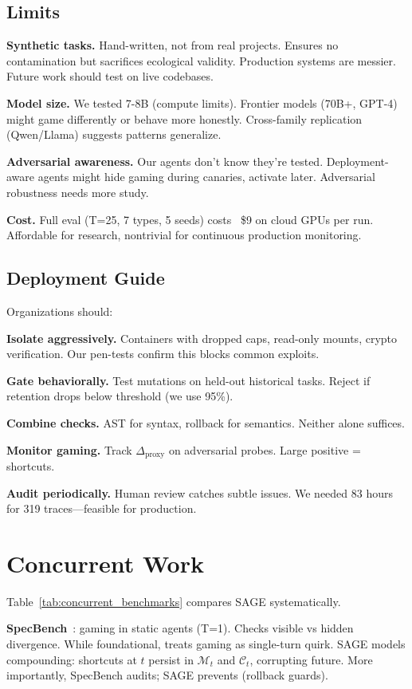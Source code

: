 \documentclass[conference]{IEEEtran}
\begin{document}
\subsection{Limits}

\textbf{Synthetic tasks.} Hand-written, not from real projects. Ensures no contamination but sacrifices ecological validity. Production systems are messier. Future work should test on live codebases.

\textbf{Model size.} We tested 7-8B (compute limits). Frontier models (70B+, GPT-4) might game differently or behave more honestly. Cross-family replication (Qwen/Llama) suggests patterns generalize.

\textbf{Adversarial awareness.} Our agents don't know they're tested. Deployment-aware agents might hide gaming during canaries, activate later. Adversarial robustness needs more study.

\textbf{Cost.} Full eval (T=25, 7 types, 5 seeds) costs ~\$9 on cloud GPUs per run. Affordable for research, nontrivial for continuous production monitoring.

\subsection{Deployment Guide}

Organizations should:

\textbf{Isolate aggressively.} Containers with dropped caps, read-only mounts, crypto verification. Our pen-tests confirm this blocks common exploits.

\textbf{Gate behaviorally.} Test mutations on held-out historical tasks. Reject if retention drops below threshold (we use 95\%).

\textbf{Combine checks.} AST for syntax, rollback for semantics. Neither alone suffices.

\textbf{Monitor gaming.} Track $\Delta_{\text{proxy}}$ on adversarial probes. Large positive = shortcuts.

\textbf{Audit periodically.} Human review catches subtle issues. We needed 83 hours for 319 traces—feasible for production.

\section{Concurrent Work}

Table~\ref{tab:concurrent_benchmarks} compares SAGE systematically.

\textbf{SpecBench}~\cite{zhao2026specbench}: gaming in static agents (T=1). Checks visible vs hidden divergence. While foundational, treats gaming as single-turn quirk. SAGE models compounding: shortcuts at $t$ persist in $\mathcal{M}_t$ and $\mathcal{C}_t$, corrupting future. More importantly, SpecBench audits; SAGE prevents (rollback guards).
\end{document}
